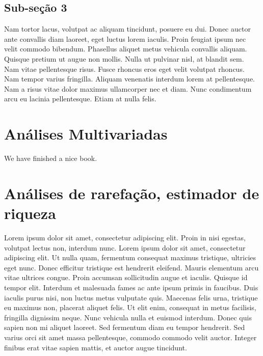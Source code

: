 \documentclass[]{book}
\begin{document}
\hypertarget{sub-seuxe7uxe3o-3-2}{%
\section{Sub-seção 3}\label{sub-seuxe7uxe3o-3-2}}

Nam tortor lacus, volutpat ac aliquam tincidunt, posuere eu dui. Donec auctor ante convallis diam laoreet, eget luctus lorem iaculis. Proin feugiat ipsum nec velit commodo bibendum. Phasellus aliquet metus vehicula convallis aliquam. Quisque pretium ut augue non mollis. Nulla ut pulvinar nisl, at blandit sem. Nam vitae pellentesque risus. Fusce rhoncus eros eget velit volutpat rhoncus. Nam tempor varius fringilla. Aliquam venenatis interdum lorem at pellentesque. Nam a risus vitae dolor maximus ullamcorper nec et diam. Nunc condimentum arcu eu lacinia pellentesque. Etiam at nulla felis.

\hypertarget{anuxe1lises-multivariadas}{%
\chapter{Análises Multivariadas}\label{anuxe1lises-multivariadas}}

We have finished a nice book.

\hypertarget{anuxe1lises-de-rarefauxe7uxe3o-estimador-de-riqueza}{%
\chapter{Análises de rarefação, estimador de riqueza}\label{anuxe1lises-de-rarefauxe7uxe3o-estimador-de-riqueza}}

Lorem ipsum dolor sit amet, consectetur adipiscing elit. Proin in nisi egestas, volutpat lectus non, interdum nunc. Lorem ipsum dolor sit amet, consectetur adipiscing elit. Ut nulla quam, fermentum consequat maximus tristique, ultricies eget nunc. Donec efficitur tristique est hendrerit eleifend. Mauris elementum arcu vitae ultrices congue. Proin accumsan sollicitudin augue et iaculis. Quisque id tempor elit. Interdum et malesuada fames ac ante ipsum primis in faucibus. Duis iaculis purus nisi, non luctus metus vulputate quis. Maecenas felis urna, tristique eu maximus non, placerat aliquet felis. Ut elit enim, consequat in metus facilisis, fringilla dignissim neque. Nunc vehicula nulla et euismod interdum. Donec quis sapien non mi aliquet laoreet. Sed fermentum diam eu tempor hendrerit. Sed varius orci sit amet massa pellentesque, commodo commodo velit auctor. Integer finibus erat vitae sapien mattis, et auctor augue tincidunt.
\end{document}
